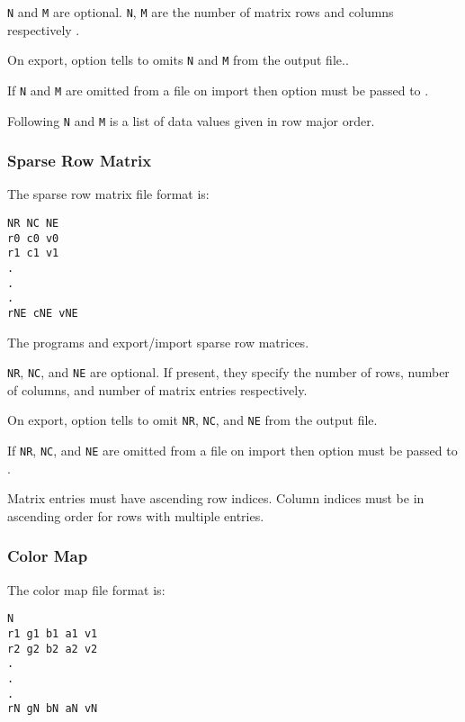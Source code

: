 \verb|N| and \verb|M| are optional.  \verb|N|, \verb|M| are the number
of matrix rows and columns respectively .  

On export, option  tells
 to omits \verb|N| and \verb|M| from the
output file..

If \verb|N| and \verb|M| are omitted from a file on import then option
 must be passed to
.

Following \verb|N| and \verb|M| is a list of data values given in row
major order.


\subsubsection{Sparse Row Matrix}

The sparse row matrix file format is:

\begin{verbatim}
NR NC NE
r0 c0 v0
r1 c1 v1
.
.
.
rNE cNE vNE
\end{verbatim}

The programs  and
 export/import sparse row matrices.

\verb|NR|, \verb|NC|, and \verb|NE| are optional.  If present, they
specify the number of rows, number of columns, and number of matrix
entries respectively.

On export, option  tells
 to omit \verb|NR|, \verb|NC|, and
\verb|NE| from the output file.

If \verb|NR|, \verb|NC|, and \verb|NE| are omitted from a file on
import then option  must be
passed to .  

Matrix entries must have ascending row indices. Column indices must be
in ascending order for rows with multiple entries.

\subsubsection{Color Map}
\label{sec:colormap_fmt}

The color map file format is:

\begin{verbatim}
N
r1 g1 b1 a1 v1
r2 g2 b2 a2 v2
.
.
.
rN gN bN aN vN
\end{verbatim}

